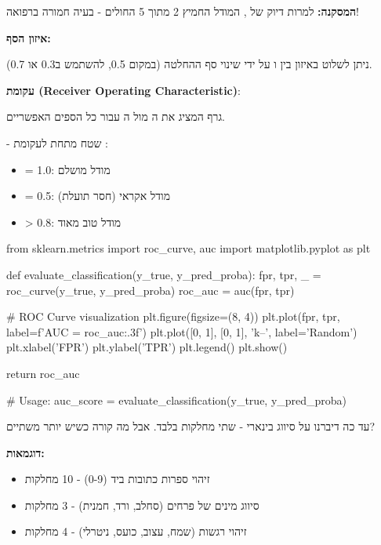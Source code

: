 \textbf{המסקנה:} למרות דיוק של , המודל החמיץ \num{2} מתוך \num{5} החולים - בעיה חמורה ברפואה!

\textbf{איזון הסף:}

ניתן לשלוט באיזון בין  ו על ידי שינוי סף ההחלטה (במקום \num{0.5}, להשתמש ב\num{0.3} או \num{0.7}).

\textbf{עקומת  (Receiver Operating Characteristic)}:

גרף המציג את ה מול ה עבור כל הספים האפשריים.

\textbf{} - שטח מתחת לעקומת :
\begin{itemize}
\item {} = \num{1.0}: מודל מושלם
\item {} = \num{0.5}: מודל אקראי (חסר תועלת)
\item {} > \num{0.8}: מודל טוב מאוד
\end{itemize}

\begin{pythonbox*}
from sklearn.metrics import roc_curve, auc
import matplotlib.pyplot as plt

def evaluate_classification(y_true, y_pred_proba):
    fpr, tpr, _ = roc_curve(y_true, y_pred_proba)
    roc_auc = auc(fpr, tpr)

    # ROC Curve visualization
    plt.figure(figsize=(8, 4))
    plt.plot(fpr, tpr, label=f'AUC = {roc_auc:.3f}')
    plt.plot([0, 1], [0, 1], 'k--', label='Random')
    plt.xlabel('FPR')
    plt.ylabel('TPR')
    plt.legend()
    plt.show()

    return roc_auc

# Usage: auc_score = evaluate_classification(y_true, y_pred_proba)
\end{pythonbox*}


עד כה דיברנו על סיווג בינארי - שתי מחלקות בלבד. אבל מה קורה כשיש יותר משתיים?

\textbf{דוגמאות:}
\begin{itemize}
\item זיהוי ספרות כתובות ביד (\num{0}-\num{9}) - \num{10} מחלקות
\item סיווג מינים של פרחים (סחלב, ורד, חמנית) - \num{3} מחלקות
\item זיהוי רגשות (שמח, עצוב, כועס, ניטרלי) - \num{4} מחלקות
\end{itemize}

